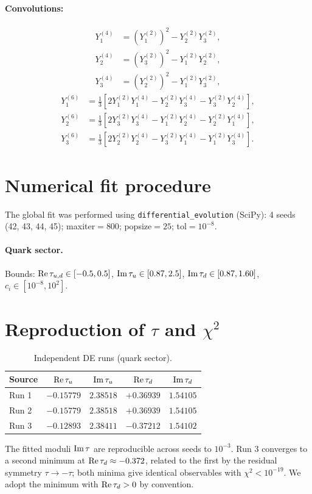 \documentclass[12pt,a4paper]{article}
\numberwithin{equation}{section}
\begin{document}
\paragraph{Convolutions:}
\begin{align}
Y_1^{(4)} &= (Y_1^{(2)})^2 - Y_2^{(2)} Y_3^{(2)}, \\
Y_2^{(4)} &= (Y_3^{(2)})^2 - Y_1^{(2)} Y_2^{(2)}, \\
Y_3^{(4)} &= (Y_2^{(2)})^2 - Y_1^{(2)} Y_3^{(2)},
\end{align}
\begin{align}
Y_1^{(6)} &= \tfrac13\left[2 Y_1^{(2)} Y_1^{(4)} - Y_2^{(2)} Y_3^{(4)} - Y_3^{(2)} Y_2^{(4)}\right], \\
Y_2^{(6)} &= \tfrac13\left[2 Y_3^{(2)} Y_3^{(4)} - Y_1^{(2)} Y_2^{(4)} - Y_2^{(2)} Y_1^{(4)}\right], \\
Y_3^{(6)} &= \tfrac13\left[2 Y_2^{(2)} Y_2^{(4)} - Y_3^{(2)} Y_1^{(4)} - Y_1^{(2)} Y_3^{(4)}\right].
\end{align}

\section{Numerical fit procedure}
The global fit was performed using \texttt{differential\_evolution} (SciPy): 4 seeds (42, 43, 44, 45); maxiter\(=800\); popsize\(=25\); tol\(=10^{-8}\).
\paragraph{Quark sector.} Bounds: \({\rm Re}\,\tau_{u,d}\in[-0.5,0.5]\), \({\rm Im}\,\tau_u\in[0.87,2.5]\), \({\rm Im}\,\tau_d\in[0.87,1.60]\), \(c_i\in[10^{-8},10^2]\).

\section{Reproduction of \(\tau\) and \(\chi^2\)}
\begin{table}[H]
\centering
\caption{Independent DE runs (quark sector).}
\begin{tabular}{lcccc}
\toprule
Source & \({\rm Re}\,\tau_u\) & \({\rm Im}\,\tau_u\) & \({\rm Re}\,\tau_d\) & \({\rm Im}\,\tau_d\) \\
\midrule
Run 1 & \(-0.15779\) & \(2.38518\) & \(+0.36939\) & \(1.54105\) \\
Run 2 & \(-0.15779\) & \(2.38518\) & \(+0.36939\) & \(1.54105\) \\
Run 3 & \(-0.12893\) & \(2.38411\) & \(-0.37212\) & \(1.54102\) \\
\bottomrule
\end{tabular}
\end{table}
The fitted moduli \({\rm Im}\,\tau\) are reproducible across seeds to \(10^{-3}\). Run 3 converges to a second minimum at \({\rm Re}\,\tau_d \approx -0.372\), related to the first by the residual symmetry \(\tau \to -\tau\); both minima give identical observables with \(\chi^2 < 10^{-19}\). We adopt the minimum with \({\rm Re}\,\tau_d > 0\) by convention.
\end{document}
